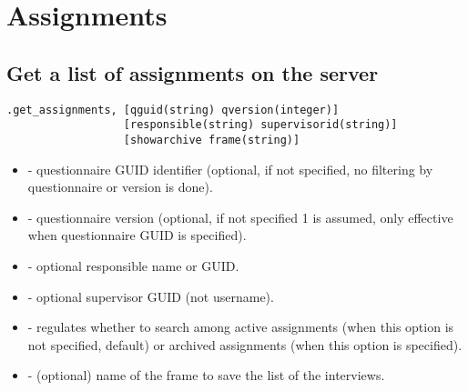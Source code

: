 \section{Assignments}





\subsection{Get a list of assignments on the server}
\begin{lstlisting}[style=CommandLineStyle]
.get_assignments, [qguid(string) qversion(integer)]
                  [responsible(string) supervisorid(string)]
                  [showarchive frame(string)]

\end{lstlisting}

\optsheader
\begin{itemize}
  \item {} - questionnaire GUID identifier (optional, if not specified, no filtering by questionnaire or version is done).
  \item {} - questionnaire version (optional, if not specified 1 is assumed, only effective when questionnaire GUID is specified).
  \item {} - optional responsible name or GUID.
  \item {} - optional supervisor GUID (not username).
  \item {} - regulates whether to search among active assignments (when this option is not specified, default) or archived assignments (when this option is specified).
  \item {} - (optional) name of the frame to save the list of the interviews.
\end{itemize}

